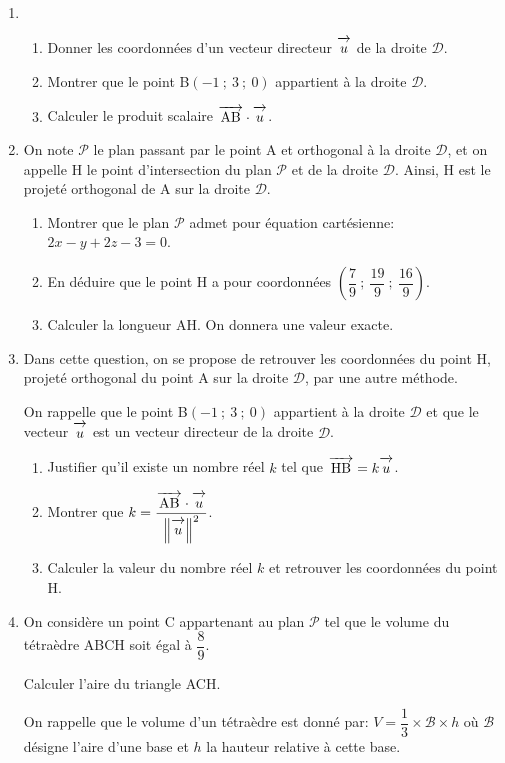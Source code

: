 \documentclass[10pt,a4paper]{article}
\newcommand{\vect}[1]{\overrightarrow{\,\mathstrut#1\,}}
\begin{document}
\begin{enumerate}
\item 
	\begin{enumerate}
		\item Donner les coordonnées d'un vecteur directeur $\vect{u}$ de la droite $\mathcal{D}$.
		
		\item Montrer que le point B$(-1~;~3~;~0)$ appartient à la droite $\mathcal{D}$.
		\item Calculer le produit scalaire $\vect{\text{AB}} \cdot \vect{u}$.
	\end{enumerate}	
\item On note $\mathcal{P}$ le plan passant par le point A et orthogonal à la droite $\mathcal{D}$, et on appelle H le point d'intersection du plan $\mathcal{P}$ et de la droite $\mathcal{D}$. Ainsi, H est le projeté orthogonal de A sur la droite $\mathcal{D}$.
	\begin{enumerate}
		\item Montrer que le plan $\mathcal{P}$ admet pour équation cartésienne: $2x - y + 2z - 3 = 0$.
		\item En déduire que le point H a pour coordonnées $\left(\dfrac79~;~\dfrac{19}{9}~;~\dfrac{16}{9}\right)$.
		\item Calculer la longueur AH. On donnera une valeur exacte.
	\end{enumerate}	
\item Dans cette question, on se propose de retrouver les coordonnées du point H, projeté orthogonal du point A sur la droite $\mathcal{D}$, par une autre méthode.

On rappelle que le point B$(-1~;~3~;~0)$ appartient à la droite $\mathcal{D}$ et que le vecteur $\vect{u}$ est un vecteur directeur de la droite $\mathcal{D}$.
	\begin{enumerate}
		\item Justifier qu'il existe un nombre réel $k$ tel que $\vect{\text{HB}} = k\vect{u}$.
		\item Montrer que $k = \dfrac{\vect{\text{AB}} \cdot \vect{u}}{\left\|\vect{u}\right\|^2}$.
		\item Calculer la valeur du nombre réel $k$ et retrouver les coordonnées du point H.
	\end{enumerate}
\item On considère un point C appartenant au plan $\mathcal{P}$ tel que le volume du tétraèdre ABCH soit égal à $\dfrac89$.

Calculer l'aire du triangle ACH.

On rappelle que le volume d'un tétraèdre est donné par: $V = \dfrac13 \times \mathcal{B} \times h$ où $\mathcal{B}$ désigne l'aire d'une base et $h$ la hauteur relative à cette base.
\end{enumerate}
\end{document}
